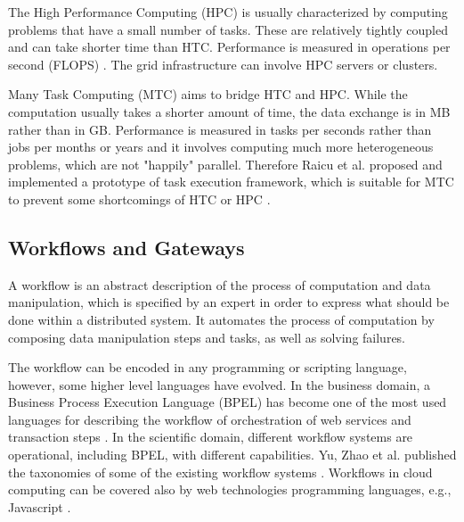 The High Performance Computing (HPC) is usually characterized by computing problems that have a small number of tasks. These are relatively tightly coupled and can take shorter time than HTC. Performance is measured in operations per second (FLOPS) \cite{Hager2010,Levesque2010}. The grid infrastructure can involve HPC servers or clusters.%

Many Task Computing (MTC) aims to bridge HTC and HPC. While the computation usually takes a shorter amount of time, the data exchange is in MB rather than in GB. Performance is measured in tasks per seconds rather than jobs per months or years and it involves computing much more heterogeneous problems, which are not "happily" parallel. %
Therefore Raicu et al. proposed and implemented a prototype of task execution framework, which is suitable for MTC to prevent some shortcomings of HTC or HPC \cite{Raicu2008, Raicu2009,Raicu2010}.

\subsection{Workflows and Gateways}
\label{sec:introworkflow}
A workflow is an abstract description of the process of computation and data manipulation, which is  specified by an expert in order to express what should be done within a distributed system. It automates the process of computation by composing data manipulation steps and tasks, as well as solving failures.

The workflow can be encoded in any programming or scripting language, however, some higher level languages have evolved. In the business domain, a Business Process Execution Language (BPEL) has become one of the most used languages for describing the workflow of orchestration of web services and transaction steps \cite{Pasley2005}. In the scientific domain, different workflow systems are operational, including BPEL, with different capabilities. Yu, Zhao et al. published the taxonomies of some of the existing workflow systems \cite{Yu2005a,Zhao2008,Curcin2008}. Workflows in cloud computing can be covered also by web technologies programming languages, e.g., Javascript \cite{Foster2008}.

